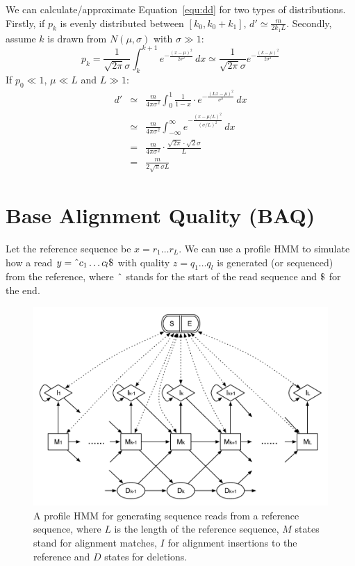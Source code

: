 \documentclass[pdftex,10pt]{book}
\begin{document}
We can calculate/approximate Equation~\ref{equ:dd} for two types of
distributions. Firstly, if $p_k$ is evenly distributed between
$[k_0,k_0+k_1]$, $d'\simeq\frac{m}{2k_1L}$. Secondly, assume $k$ is
drawn from $N(\mu,\sigma)$ with $\sigma\gg 1$:
\begin{equation*}
  p_k=\frac{1}{\sqrt{2\pi}\sigma}\int_k^{k+1}e^{-\frac{(x-\mu)^2}{2\sigma^2}}\,dx
  \simeq \frac{1}{\sqrt{2\pi}\sigma}e^{-\frac{(k-\mu)^2}{2\sigma^2}}
\end{equation*}
If $p_0\ll 1$, $\mu\ll L$ and $L\gg 1$:
\begin{eqnarray*}
  d'&\simeq&\frac{m}{4\pi\sigma^2}\int_0^1\frac{1}{1-x}\cdot e^{-\frac{(Lx-\mu)^2}{\sigma^2}}\,dx\\
  &\simeq&\frac{m}{4\pi\sigma^2}\int_{-\infty}^{\infty}e^{-\frac{(x-\mu/L)^2}{(\sigma/L)^2}}\,dx\\
  &=&\frac{m}{4\pi\sigma^2}\cdot\frac{\sqrt{2\pi}\cdot \sqrt{2}\sigma}{L}\\
  &=&\frac{m}{2\sqrt{\pi}\sigma L}
\end{eqnarray*}

\chapter{Base Alignment Quality (BAQ)}

Let the reference sequence be $x=r_1\ldots r_L$. We can use a profile
HMM to simulate how a read $y={\tt\char94}c_1\ldots c_l{\tt\char36}$
with quality $z=q_1\ldots q_l$ is generated (or sequenced) from the
reference, where ${\tt\char94}$ stands for the start of the read
sequence and ${\tt\char36}$ for the end.

\begin{figure}[!hb]
\includegraphics[width=\textwidth]{ahmm}
\caption{A profile HMM for generating sequence reads from a reference
  sequence, where $L$ is the length of the reference sequence, $M$
  states stand for alignment matches, $I$ for alignment insertions to
  the reference and $D$ states for deletions.}\label{fig:ahmm}
\end{figure}
\end{document}
